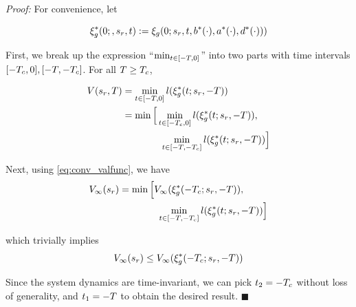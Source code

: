 \textit{Proof:} For convenience, let

\begin{equation}
\xi_g^*(0;, s_r, t) := \xi_g(0; s_r, t, b^*(\cdot), a^*(\cdot), d^*(\cdot)))
\end{equation}

First, we break up the expression ``$\min_{t \in [-T, 0]}$'' into two parts with time intervals $[-T_c, 0], [-T, -T_c]$. For all $T \ge T_c$,
   
   \begin{equation}
   \begin{aligned}
   V(s_r, T) &= \min_{t \in [-T, 0]} l(\xi_g^*(t; s_r, -T)) \\
   &= \min \Big[ \min_{t \in [-T_c, 0]} l(\xi_g^*(t; s_r, -T)), \\
   &\qquad\qquad\min_{t \in [-T, -T_c]} l(\xi_g^*(t; s_r, -T)) \Big]
   \end{aligned}
   \end{equation}
   
   Next, using \eqref{eq:conv_valfunc}, we have
   \begin{equation}
   \begin{aligned}
   V_\infty(s_r) &= \min \Big[ V_\infty(\xi_g^*(-T_c; s_r, -T)), \\
   &\qquad\qquad\min_{t \in [-T, -T_c]} l(\xi_g^*(t; s_r, -T)) \Big]
   \end{aligned}
   \end{equation}
   
   \noindent which trivially implies
   \begin{equation}
   V_\infty(s_r) \le V_\infty(\xi_g^*(-T_c; s_r, -T))
   \end{equation}
   
   Since the system dynamics are time-invariant, we can pick $t_2 = -T_c$ without loss of generality, and $t_1 = -T$ to obtain the desired result. \hfill $\blacksquare$
 

